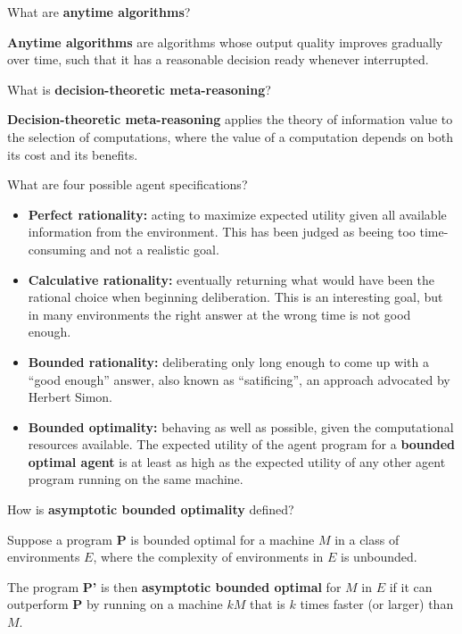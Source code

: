 
\begin{flashcard}[Question]{What are \textbf{anytime algorithms}?}
\begin{center}
\textbf{Anytime algorithms} are algorithms whose output quality improves gradually over time, such that it has a reasonable decision ready whenever interrupted.
\end{center}
\end{flashcard}

\begin{flashcard}[Question]{What is \textbf{decision-theoretic meta-reasoning}?}
\begin{center}
\textbf{Decision-theoretic meta-reasoning} applies the theory of information value to the selection of computations, where the value of a computation depends on both its cost and its benefits.
\end{center}
\end{flashcard}

\begin{flashcard}[Question]{What are four possible agent specifications?}
\begin{center}
\begin{itemize}
\item \textbf{Perfect rationality:} acting to maximize expected utility given all available information from the environment. This has been judged as beeing too time-consuming and not a realistic goal.
\item \textbf{Calculative rationality:} eventually returning what would have been the rational choice when beginning deliberation. This is an interesting goal, but in many environments the right answer at the wrong time is not good enough.
\item \textbf{Bounded rationality:} deliberating only long enough to come up with a ``good enough'' answer, also known as ``satificing'', an approach advocated by Herbert Simon.
\item \textbf{Bounded optimality:} behaving as well as possible, given the computational resources available. The expected utility of the agent program for a \textbf{bounded optimal agent} is at least as high as the expected utility of any other agent program running on the same machine.
\end{itemize}
\end{center}
\end{flashcard}

\begin{flashcard}[Question]{How is \textbf{asymptotic bounded optimality} defined?}
\begin{center}
Suppose a program \textbf{P} is bounded optimal for a machine $M$ in a class of environments $E$, where the complexity of environments in $E$ is unbounded.

\medskip

The program \textbf{P'} is then \textbf{asymptotic bounded optimal} for $M$ in $E$ if it can outperform \textbf{P} by running on a machine $kM$ that is $k$ times faster (or larger) than $M$.
\end{center}
\end{flashcard}
